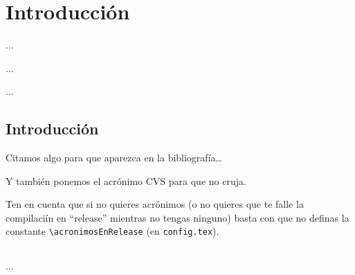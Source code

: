 %
%

\chapter{Introducción}

\begin{FraseCelebre}
\begin{Frase}
...
\end{Frase}
\begin{Fuente}
...
\end{Fuente}
\end{FraseCelebre}

\begin{resumen}
...
\end{resumen}


\section{Introducción}
\label{cap1:sec:introduccion}

Citamos algo para que aparezca en la bibliografía\ldots
\citep{ldesc2e}

\medskip

Y también ponemos el acrónimo \ac{CVS} para que no cruja.

Ten en cuenta que si no quieres acrónimos (o no quieres que te falle la compilaciín en ``release'' mientras no tengas ninguno) basta con que no definas la constante \verb+\acronimosEnRelease+ (en \texttt{config.tex}).

\cite{notsoshort}
\section*{\ProximoCapitulo}
\TocProximoCapitulo

...

